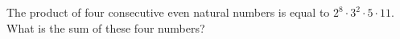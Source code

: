 The product of four consecutive even natural numbers is equal to $2^{8}\cdot3^{2}\cdot5\cdot11$. What is the sum of these four numbers?
